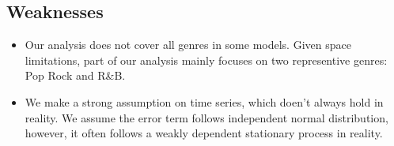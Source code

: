 \documentclass[12pt]{article}  %
\begin{document}
	\subsection{Weaknesses}
	\begin{itemize}
		\setlength{\parsep}{2ex} %
		\setlength{\topsep}{2ex} %
		\setlength{\itemsep}{1ex} %
		\item Our analysis does not cover all genres in some models. Given space limitations, part of our analysis mainly focuses on two representive genres: Pop Rock and R\&B.
		\item We make a strong assumption on time series, which doen’t always hold in reality. We assume the error term follows independent normal distribution, however, it often follows a weakly dependent stationary process in reality.
	\end{itemize}
	
	
	
	
\end{document}
